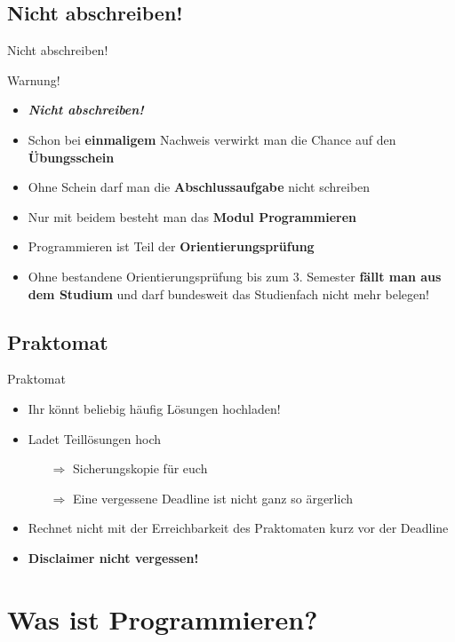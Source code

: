 \documentclass[usepdftitle=false,hyperref={pdfpagelabels=false}]{beamer}
\begin{document}
\subsection{Nicht abschreiben!}
\begin{frame}{Nicht abschreiben!}
\begin{alertblock}{Warnung!}
\begin{itemize}
\item \emph{\textbf{Nicht abschreiben!}}
\item Schon bei \textbf{einmaligem} Nachweis verwirkt man die Chance auf den \textbf{Übungsschein}
\item Ohne Schein darf man die \textbf{Abschlussaufgabe} nicht schreiben
\item Nur mit beidem besteht man das \textbf{Modul Programmieren}
\item Programmieren ist Teil der \textbf{Orientierungsprüfung}
\item Ohne bestandene Orientierungsprüfung bis zum 3. Semester \textbf{fällt man aus dem Studium} und darf bundesweit das Studienfach nicht mehr belegen!
\end{itemize}
\end{alertblock}
\end{frame}

\subsection{Praktomat}
\begin{frame}{Praktomat}
    \begin{itemize}
        \item Ihr könnt beliebig häufig Lösungen hochladen!
        \item Ladet Teillösungen hoch
        \begin{itemize}
            \item[$\Rightarrow$] Sicherungskopie für euch
            \item[$\Rightarrow$] Eine vergessene Deadline ist nicht ganz so ärgerlich
        \end{itemize}
        \item Rechnet nicht mit der Erreichbarkeit des Praktomaten
              kurz vor der Deadline
        \item \textbf{Disclaimer nicht vergessen!}
    \end{itemize}
\end{frame}

\section{Was ist Programmieren?}
\end{document}
